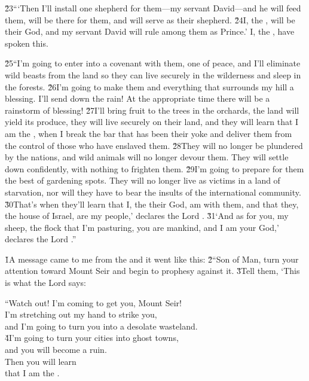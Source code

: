 \v{23}```Then I'll install one shepherd for them---my servant David---and he will feed them, will be there for them, and will serve as their shepherd. \v{24}I, the , will be their God, and my servant David will rule among them as Prince.' I, the , have spoken this.

\v{25}``I'm going to enter into a covenant with them, one of peace, and I'll eliminate wild beasts from the land so they can live securely in the wilderness and sleep in the forests. \v{26}I'm going to make them and everything that surrounds my hill a blessing. I'll send down the rain! At the appropriate time there will be a rainstorm of blessing! \v{27}I'll bring fruit to the trees in the orchards, the land will yield its produce, they will live securely on their land, and they will learn that I am the , when I break the bar that has been their yoke and deliver them from the control of those who have enslaved them. \v{28}They will no longer be plundered by the nations, and wild animals will no longer devour them. They will settle down confidently, with nothing to frighten them. \v{29}I'm going to prepare for them the best of gardening spots. They will no longer live as victims in a land of starvation, nor will they have to bear the insults of the international community. \v{30}That's when they'll learn that I, the  their God, am with them, and that they, the house of Israel, are my people,' declares the Lord . \v{31}`And as for you, my sheep, the flock that I'm pasturing, you are mankind, and I am your God,' declares the Lord .''

\v{1}A message came to me from the  and it went like this: \v{2}``Son of Man, turn your attention toward Mount Seir and begin to prophesy against it. \v{3}Tell them, `This is what the Lord  says:

\begin{poetry}
\poeml ``Watch out! I'm coming to get you, Mount Seir! \\
\poemll    I'm stretching out my hand to strike you, \\
\poemlll       and I'm going to turn you into a desolate wasteland. \\
\poeml \v{4}I'm going to turn your cities into ghost towns, \\
\poemll    and you will become a ruin. \\
\poeml Then you will learn \\
\poemll    that I am the .
\end{poetry}

